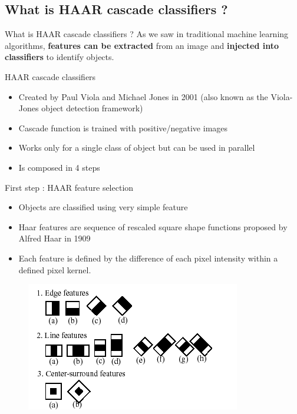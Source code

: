 \documentclass[tikz,table,border=2mm]{beamer}
\begin{document}
\subsection{What is HAAR cascade classifiers ?}
\begin{frame}{What is HAAR cascade classifiers ?}
As we saw in traditional machine learning algorithms, \textbf{features can be extracted} from an image and \textbf{injected into classifiers} to identify objects.
\begin{block}{HAAR cascade classifiers}
\begin{itemize}
	\item Created by Paul Viola and Michael Jones in 2001 (also known as the Viola-Jones object detection framework)
	\item Cascade function is trained with positive/negative images
	\item Works only for a single class of object but can be used in parallel
	\item Is composed in 4 steps
\end{itemize}
\end{block}
\end{frame}
\begin{frame}{First step : HAAR feature selection}

\begin{itemize}
	\item Objects are classified using very simple feature
	\item Haar features are sequence of rescaled square shape functions proposed by Alfred Haar in 1909
	\item Each feature is defined by the difference of each pixel intensity within a defined pixel kernel.
\end{itemize}
\begin{figure}
    \includegraphics[width=0.5\linewidth]{images/haar_set.png}
\end{figure}
\end{frame}
\end{document}
